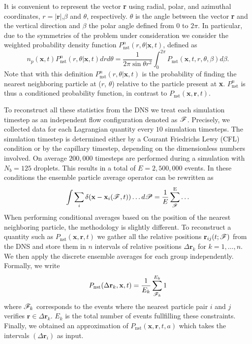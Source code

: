 It is convenient to represent the vector \textbf{r} using radial, polar, and azimuthal coordinates,  $r = |\textbf{r}|$,$\beta$ and $\theta$, respectively. $\theta$ is the angle between the vector \textbf{r} and the vertical direction and $\beta$ the polar angle defined from $0$ to $2\pi$. In particular, due to the symmetries of the problem under consideration we consider the weighted probability density function $P_\text{nst}^n(r,\theta|\textbf{x},t)$, defined as
\begin{equation}
    n_p(\textbf{x},t) P_\text{nst}^n(r,\theta|\textbf{x},t)dr d\theta 
    =\frac{1}{2\pi \sin\theta r^2 }
    \int_0^{2\pi}
    P_\text{nst}(\textbf{x},t,r,\theta,\beta) 
    d\beta.
    \label{eq:Ptheta_r}
\end{equation}
Note that with this definition $P_\text{nst}^n(r,\theta|\textbf{x},t)$ is the probability of finding the nearest neighboring particle at ($r$, $\theta$) relative to the particle present at \textbf{x}. 
$P_\text{nst}^n$ is thus a conditioned probability function, in contrast to $P_\text{nst}(\textbf{x},\textbf{r},t)$. 

To reconstruct all these statistics from the DNS we treat each simulation timestep as an independent flow configuration denoted as $\mathscr{F}$. 
Precisely, we collected data for each Lagrangian quantity every $10$ simulation timesteps. 
The simulation timestep is determined either by a Courant Friedrichs Lewy (CFL) condition or by the capillary timestep, depending on the dimensionless numbers involved.
On average $200,000$ timesteps are performed during a simulation with $N_b = 125$ droplets. 
This results in a total of $E = 2,500,000$ events. 
In these conditions the ensemble particle average operator can be rewritten as
\begin{equation}
    \int \sum_i \delta(\textbf{x}-\textbf{x}_i(\mathscr{F},t)) \ldots d\mathscr{P}
    = \frac{1}{E}\sum_{\mathscr{F}}^\text{E} \ldots 
    \label{eq:discrete_ensemble_average}
\end{equation}  
When performing conditional averages based on the position of the nearest neighboring particle, the methodology is slightly different. 
To reconstruct a quantity such as $P_\text{nst}(\textbf{x},\textbf{r},t)$ we gather all the relative positions $\textbf{r}_{ij}(t;\mathscr{F})$ from the DNS and store them in $n$ intervals of relative positions $\Delta \textbf{r}_k$ for $k = 1,\ldots, n$.
We then apply the discrete ensemble averages for each group independently.
Formally, we write
\begin{equation}
    P_\text{nst}(\Delta\textbf{r}_k,\textbf{x},t)
    = \frac{1}{E_k} 
    \sum^{E_k}_{\mathscr{F}_k} 
    1
    \label{eq:vec_cond}
\end{equation}
where $\mathscr{F}_k$ corresponds to the events where the nearest particle pair $i$ and $j$ verifies $\textbf{r} \in \Delta \textbf{r}_k$.
$E_k$ is the total number of events fullfilling these constraints. 
Finally, we obtained an approximation of $P_\text{nst}(\textbf{x},\textbf{r},t,a)$ which takes the intervals $(\Delta\textbf{r}_i)$ as input.

